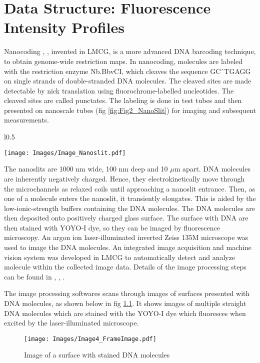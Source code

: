 \chapter{Data Structure: Fluorescence Intensity Profiles}

Nanocoding \cite{Jo_etal_2007_PNAS}, \cite{Jo_etal_2009}, invented in LMCG, is a more advanced DNA barcoding technique, to obtain genome-wide restriction maps. In nanocoding, molecules are labeled with the restriction enzyme Nb.BbvCI, which cleaves the sequence GC\^\ TGAGG on single strands of double-stranded DNA molecules. The cleaved sites are made detectable by nick translation using fluorochrome-labelled nucleotides. The cleaved sites are called punctates. The labeling is done in test tubes and then presented on nanoscale tubes (fig \ref{fig:Fig2_NanoSlit}) for imaging and subsequent measurements. 
\begin{wrapfigure}{l}{0.5\textwidth}
\begin{center}
\texttt{[image: Images/Image\_Nanoslit.pdf]}
\end{center}
\caption{Nanoslits where DNA molecules are presented}
\label{fig:Fig2_NanoSlit}
\end{wrapfigure}
The nanoslits are 1000 nm wide, 100 nm deep and 10 $\mu$m apart. DNA molecules are inherently negatively charged. Hence, they electrokinetically move through the microchannels as relaxed coils until approaching a nanoslit entrance. Then, as one of a molecule enters the nanoslit, it transiently elongates. This is aided by the low-ionic-strength buffers containing the DNA molecules. The DNA molecules are then deposited onto positively charged glass surface. The surface with DNA are then stained with YOYO-I dye, so they can be imaged by fluorescence microscopy. An argon ion laser-illuminated inverted Zeiss 135M microscope was used to image the DNA molecules. An integrated image acquisition and machine vision system was developed in LMCG to automatically detect and analyze molecule within the collected image data. Details of the image processing steps can be found in \cite{Dimalanta_etal_2004_AnalChem}, \cite{Jo_etal_2007_PNAS}, \cite{Ravindran_Gupta_2015_GigaScience}. 

The image processing softwares scans through images of surfaces presented with DNA molecules, as shown below in fig \ref{fig:Fig2_FrameImage}. It shows images of multiple straight DNA molecules which are stained with the YOYO-I dye which fluoresces when excited by the laser-illuminated microscope.  
\begin{figure}[h!]
\begin{center}
\texttt{[image: Images/Image4\_FrameImage.pdf]}
\end{center}
\caption{Image of a surface with stained DNA molecules}
\label{fig:Fig2_FrameImage}
\end{figure}

